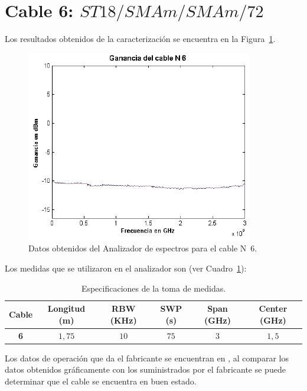\documentclass[12pt,graphicx,caption,rotating]{article}
\begin{document}
\section{Cable 6: $ST18/SMAm/SMAm/72$}
\noindent
Los resultados obtenidos de la caracterización se encuentra en la Figura~\ref{fig8}.
\begin{figure}[H]
	\centering
		\includegraphics[scale=0.6]{fig8.png}
	\caption{Datos obtenidos del Analizador de espectros para el cable N~6.}
	\label{fig8}
\end{figure}
\noindent
Los medidas que se utilizaron en el analizador son (ver Cuadro~\ref{tab4}):
\begin{table}[H]
  \centering
  \caption{Especificaciones de la toma de medidas.}
    \begin{tabular}{|c|c|c|c|c|c|}\hline
      \textbf{Cable } & \textbf{Longitud (m) } & \textbf{RBW (KHz) } & \textbf{SWP (s) } & \textbf{Span (GHz) } & \textbf{Center (GHz) } \\ \hline
      \textbf{6} & $1,75$  & $10$ & $75$ & $3$ & $1,5$  \\ \hline
    \end{tabular}
  \label{tab4}
\end{table}
\noindent
Los datos de operación que da el fabricante se encuentran en \cite{page3}, al comparar los datos obtenidos gráficamente con los suministrados por el fabricante se puede determinar que el cable se encuentra en buen estado.
\end{document}
